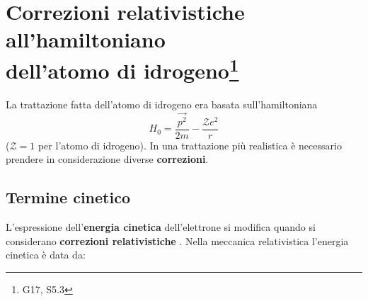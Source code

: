 \chapter[Correzioni relativistiche all'atomo di idrogeno]{Correzioni relativistiche\\ all'hamiltoniano\\ dell'atomo di idrogeno\footnote{G17, S5.3}}

La trattazione fatta dell'atomo di idrogeno era basata sull'hamiltoniana
\begin{equation} \label{eq:cap25_1}
H_0=\frac{\vec{p^2}}{2m}-\frac{\mathcal{Z} e^2}{r}
\end{equation}
($\mathcal{Z}=1$ per l'atomo di idrogeno). In una trattazione più realistica è necessario prendere in considerazione diverse \textbf{correzioni}.

\section{Termine cinetico}

L'espressione dell'\textbf{energia cinetica} dell'elettrone si modifica quando si considerano \textbf{correzioni relativistiche }. Nella meccanica relativistica l'energia cinetica è data da:

